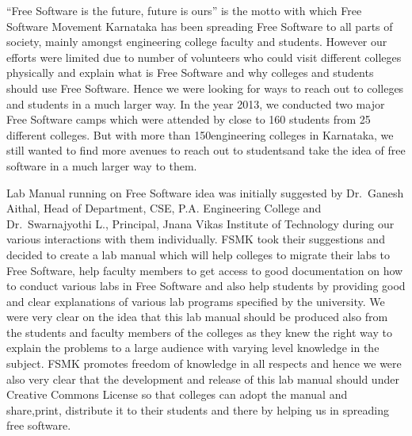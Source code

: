 ``Free Software is the future, future is ours'' is the motto with which
Free Software Movement Karnataka has been spreading Free Software to all
parts of society, mainly amongst engineering college faculty and
students. However our efforts were limited due to number of volunteers
who could visit different colleges physically and explain what is Free
Software and why colleges and students should use Free Software. Hence
we were looking for ways to reach out to colleges and students in a much
larger way. In the year 2013, we conducted two major Free Software camps
which were attended by close to 160 students from 25 different colleges.
But with more than 150engineering colleges in Karnataka, we still wanted
to find more avenues to reach out to studentsand take the idea of free
software in a much larger way to them.

Lab Manual running on Free Software idea was initially suggested by
Dr.~Ganesh Aithal, Head of Department, CSE, P.A. Engineering College and
Dr.~Swarnajyothi L., Principal, Jnana Vikas Institute of Technology
during our various interactions with them individually. FSMK took their
suggestions and decided to create a lab manual which will help colleges
to migrate their labs to Free Software, help faculty members to get
access to good documentation on how to conduct various labs in Free
Software and also help students by providing good and clear explanations
of various lab programs specified by the university. We were very clear
on the idea that this lab manual should be produced also from the
students and faculty members of the colleges as they knew the right way
to explain the problems to a large audience with varying level knowledge
in the subject. FSMK promotes freedom of knowledge in all respects and
hence we were also very clear that the development and release of this
lab manual should under Creative Commons License so that colleges can
adopt the manual and share,print, distribute it to their students and
there by helping us in spreading free software.

